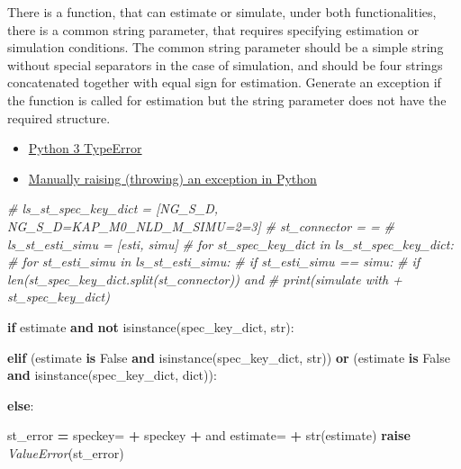 \documentclass[
]{book}
\newenvironment{Shaded}{\begin{snugshade}}{\end{snugshade}}
\newcommand{\BuiltInTok}[1]{#1}
\newcommand{\CommentTok}[1]{\textcolor[rgb]{0.56,0.35,0.01}{\textit{#1}}}
\newcommand{\ControlFlowTok}[1]{\textcolor[rgb]{0.13,0.29,0.53}{\textbf{#1}}}
\newcommand{\KeywordTok}[1]{\textcolor[rgb]{0.13,0.29,0.53}{\textbf{#1}}}
\newcommand{\NormalTok}[1]{#1}
\newcommand{\OperatorTok}[1]{\textcolor[rgb]{0.81,0.36,0.00}{\textbf{#1}}}
\newcommand{\PreprocessorTok}[1]{\textcolor[rgb]{0.56,0.35,0.01}{\textit{#1}}}
\newcommand{\StringTok}[1]{\textcolor[rgb]{0.31,0.60,0.02}{#1}}
\newcommand{\VariableTok}[1]{\textcolor[rgb]{0.00,0.00,0.00}{#1}}
\providecommand{\tightlist}{%
  \setlength{\itemsep}{0pt}\setlength{\parskip}{0pt}}
\begin{document}
There is a function, that can estimate or simulate, under both functionalities, there is a common string parameter, that requires specifying estimation or simulation conditions. The common string parameter should be a simple string without special separators in the case of simulation, and should be four strings concatenated together with equal sign for estimation. Generate an exception if the function is called for estimation but the string parameter does not have the required structure.

\begin{itemize}
\tightlist
\item
  \href{https://docs.python.org/3/library/exceptions.html\#TypeError}{Python 3 TypeError}
\item
  \href{https://stackoverflow.com/a/30317038/8280804}{Manually raising (throwing) an exception in Python}
\end{itemize}

\begin{Shaded}
\begin{Highlighting}[]
\CommentTok{\# ls\_st\_spec\_key\_dict = [\textquotesingle{}NG\_S\_D\textquotesingle{}, \textquotesingle{}NG\_S\_D=KAP\_M0\_NLD\_M\_SIMU=2=3\textquotesingle{}]}
\CommentTok{\# st\_connector = \textquotesingle{}=\textquotesingle{}}
\CommentTok{\# ls\_st\_esti\_simu = [\textquotesingle{}esti\textquotesingle{}, \textquotesingle{}simu\textquotesingle{}]}
\CommentTok{\# for st\_spec\_key\_dict in ls\_st\_spec\_key\_dict:}
\CommentTok{\#   for st\_esti\_simu in ls\_st\_esti\_simu:}
\CommentTok{\#     if st\_esti\_simu == \textquotesingle{}simu\textquotesingle{}:}
\CommentTok{\#       if len(st\_spec\_key\_dict.split(st\_connector)) and}
\CommentTok{\#         print(\textquotesingle{}simulate with \textquotesingle{} + st\_spec\_key\_dict)}

\ControlFlowTok{if}\NormalTok{ estimate }\KeywordTok{and} \KeywordTok{not} \BuiltInTok{isinstance}\NormalTok{(spec\_key\_dict, }\BuiltInTok{str}\NormalTok{):}

\ControlFlowTok{elif}\NormalTok{ (estimate }\KeywordTok{is} \VariableTok{False} \KeywordTok{and} \BuiltInTok{isinstance}\NormalTok{(spec\_key\_dict, }\BuiltInTok{str}\NormalTok{)) }\KeywordTok{or}\NormalTok{ (estimate }\KeywordTok{is} \VariableTok{False} \KeywordTok{and} \BuiltInTok{isinstance}\NormalTok{(spec\_key\_dict, }\BuiltInTok{dict}\NormalTok{)):}

\ControlFlowTok{else}\NormalTok{:}

\NormalTok{    st\_error }\OperatorTok{=} \StringTok{\textquotesingle{}speckey=\textquotesingle{}} \OperatorTok{+}\NormalTok{ speckey }\OperatorTok{+} \StringTok{\textquotesingle{} and estimate=\textquotesingle{}} \OperatorTok{+} \BuiltInTok{str}\NormalTok{(estimate)}
    \ControlFlowTok{raise} \PreprocessorTok{ValueError}\NormalTok{(st\_error)}
\end{Highlighting}
\end{Shaded}
\end{document}
